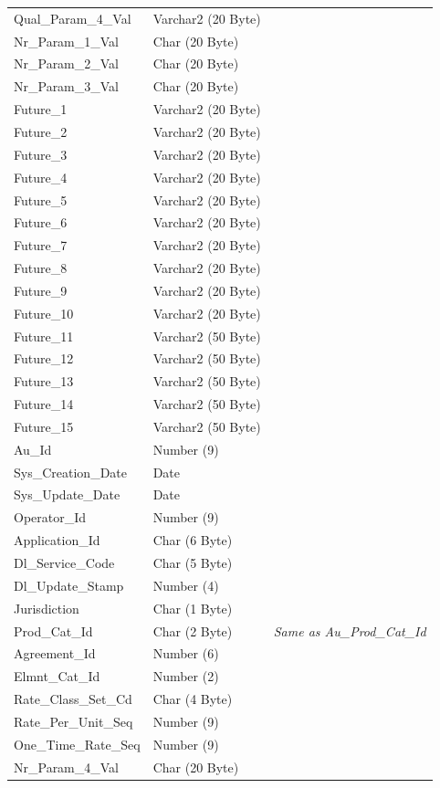 \documentclass[12pt,twoside]{article}
\begin{document}
\begin{longtable}{l|l|l}
Qual\_Param\_4\_Val & Varchar2 (20 Byte) & \\
Nr\_Param\_1\_Val & Char (20 Byte) & \\
Nr\_Param\_2\_Val & Char (20 Byte) & \\
Nr\_Param\_3\_Val & Char (20 Byte) & \\
Future\_1 & Varchar2 (20 Byte) & \\
Future\_2 & Varchar2 (20 Byte) & \\
Future\_3 & Varchar2 (20 Byte) & \\
Future\_4 & Varchar2 (20 Byte) & \\
Future\_5 & Varchar2 (20 Byte) & \\
Future\_6 & Varchar2 (20 Byte) & \\
Future\_7 & Varchar2 (20 Byte) & \\
Future\_8 & Varchar2 (20 Byte) & \\
Future\_9 & Varchar2 (20 Byte) & \\
Future\_10 & Varchar2 (20 Byte) & \\
Future\_11 & Varchar2 (50 Byte) & \\
Future\_12 & Varchar2 (50 Byte) & \\
Future\_13 & Varchar2 (50 Byte) & \\
Future\_14 & Varchar2 (50 Byte) & \\
Future\_15 & Varchar2 (50 Byte) & \\
Au\_Id & Number (9) & \\
Sys\_Creation\_Date & Date & \\
Sys\_Update\_Date & Date & \\
Operator\_Id & Number (9) & \\
Application\_Id & Char (6 Byte) & \\
Dl\_Service\_Code & Char (5 Byte) & \\
Dl\_Update\_Stamp & Number (4) & \\
Jurisdiction & Char (1 Byte) & \\
Prod\_Cat\_Id & Char (2 Byte) & \emph{Same as Au\_Prod\_Cat\_Id}\\
Agreement\_Id & Number (6) & \\
Elmnt\_Cat\_Id & Number (2) & \\
Rate\_Class\_Set\_Cd & Char (4 Byte) & \\
Rate\_Per\_Unit\_Seq & Number (9) & \\
One\_Time\_Rate\_Seq & Number (9) & \\
Nr\_Param\_4\_Val & Char (20 Byte) & \\

\end{longtable}
\end{document}
